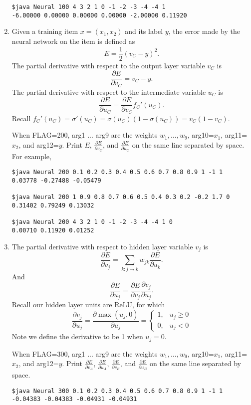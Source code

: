 \documentclass{article}
\begin{document}
\begin{enumerate}
\begin{verbatim}
$java Neural 100 4 3 2 1 0 -1 -2 -3 -4 -4 1
-6.00000 0.00000 0.00000 0.00000 -2.00000 0.11920 
\end{verbatim}

\item
Given a training item $x=(x_1, x_2)$ and its label $y$, the error made by the neural network on the item is defined as
$$E = \frac{1}{2}(v_C - y)^2.$$
The partial derivative with respect to the output layer variable $v_C$ is 
$$\frac{\partial E}{\partial v_C} = v_C - y.$$
The partial derivative with respect to the intermediate variable $u_C$ is 
$$\frac{\partial E}{\partial u_C} = \frac{\partial E}{\partial v_C} f_C'(u_C).$$
Recall $f_C'(u_C) = \sigma'(u_C) = \sigma(u_C)(1-\sigma(u_C)) = v_C (1-v_C)$.

When FLAG=200, arg1 ... arg9 are the weights $w_1, \ldots, w_9$, arg10=$x_1$, arg11=$x_2$, and arg12=$y$.
Print $E$, $\frac{\partial E}{\partial v_C}$, and $\frac{\partial E}{\partial u_C}$ on the same line separated by space. 
For example,
\begin{verbatim}
$java Neural 200 0.1 0.2 0.3 0.4 0.5 0.6 0.7 0.8 0.9 1 -1 1
0.03778 -0.27488 -0.05479

$java Neural 200 1 0.9 0.8 0.7 0.6 0.5 0.4 0.3 0.2 -0.2 1.7 0
0.31402 0.79249 0.13032

$java Neural 200 4 3 2 1 0 -1 -2 -3 -4 -4 1 0
0.00710 0.11920 0.01252
\end{verbatim}

\item 
The partial derivative with respect to hidden layer variable $v_j$ is
$$\frac{\partial E}{\partial v_j} = \sum_{k: j\rightarrow k} w_{jk} \frac{\partial E}{\partial u_k}.$$
And 
$$\frac{\partial E}{\partial u_j} = \frac{\partial E}{\partial v_j} \frac{\partial v_j}{\partial u_j}.$$
Recall our hidden layer units are ReLU, for which
$$\frac{\partial v_j}{\partial u_j}=\frac{\partial \max(u_j, 0)}{\partial u_j}=\left\{
\begin{array}{ll}
1, & u_j \ge 0 \\
0, & u_j < 0 
\end{array}
\right.$$
Note we define the derivative to be 1 when $u_j=0$.

When FLAG=300, arg1 ... arg9 are the weights $w_1, \ldots, w_9$, arg10=$x_1$, arg11=$x_2$, and arg12=$y$.
Print $\frac{\partial E}{\partial v_A}$, $\frac{\partial E}{\partial u_A}$, $\frac{\partial E}{\partial v_B}$, and $\frac{\partial E}{\partial u_B}$
on the same line separated by space. 

\begin{verbatim}
$java Neural 300 0.1 0.2 0.3 0.4 0.5 0.6 0.7 0.8 0.9 1 -1 1
-0.04383 -0.04383 -0.04931 -0.04931


\end{verbatim}
\end{enumerate}
\end{document}
